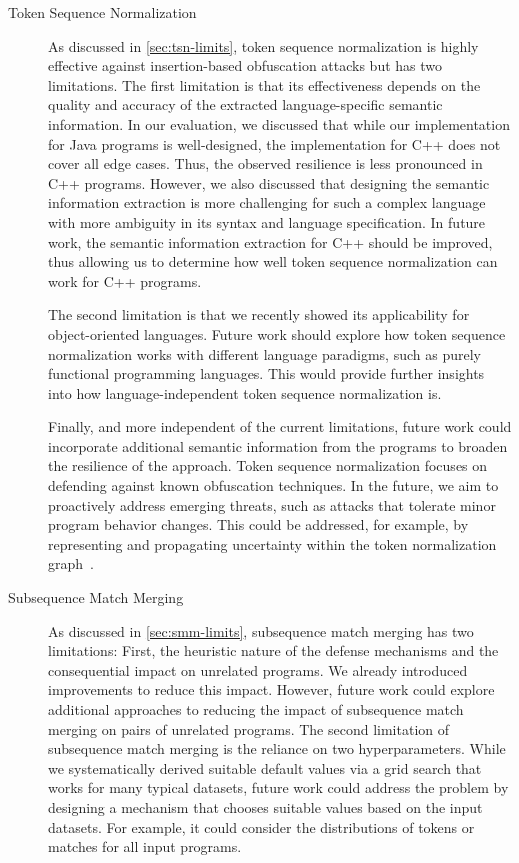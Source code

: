 \begin{description}
\item[Token Sequence Normalization]
As discussed in \autoref{sec:tsn-limits}, token sequence normalization is highly effective against insertion-based obfuscation attacks but has two limitations. The first limitation is that its effectiveness depends on the quality and accuracy of the extracted language-specific semantic information. In our evaluation, we discussed that while our implementation for Java programs is well-designed, the implementation for C++ does not cover all edge cases. Thus, the observed resilience is less pronounced in C++ programs. However, we also discussed that designing the semantic information extraction is more challenging for such a complex language with more ambiguity in its syntax and language specification.
In future work, the semantic information extraction for C++ should be improved, thus allowing us to determine how well token sequence normalization can work for C++ programs.

The second limitation is that we recently showed its applicability for object-oriented languages. Future work should explore how token sequence normalization works with different language paradigms, such as purely functional programming languages. This would provide further insights into how language-independent token sequence normalization is.

Finally, and more independent of the current limitations, future work could incorporate additional semantic information from the programs to broaden the resilience of the approach.
Token sequence normalization focuses on defending against known obfuscation techniques. In the future, we aim to proactively address emerging threats, such as attacks that tolerate minor program behavior changes.
This could be addressed, for example, by representing and propagating uncertainty within the token normalization graph~\cite{Hahner2023}.

\item[Subsequence Match Merging]
As discussed in \autoref{sec:smm-limits}, subsequence match merging has two limitations: First, the heuristic nature of the defense mechanisms and the consequential impact on unrelated programs. We already introduced improvements to reduce this impact. However, future work could explore additional approaches to reducing the impact of subsequence match merging on pairs of unrelated programs.
The second limitation of subsequence match merging is the reliance on two hyperparameters. While we systematically derived suitable default values via a grid search that works for many typical datasets, future work could address the problem by designing a mechanism that chooses suitable values based on the input datasets. For example, it could consider the distributions of tokens or matches for all input programs.


\end{description}
